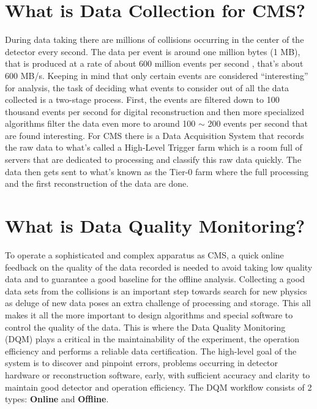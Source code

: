 \section{What is Data Collection for CMS?}

During data taking there are millions of collisions occurring in the center of the detector every second. The data per event is around one million bytes (1 MB), that is produced at a rate of about 
600 million events per second \cite{datataking}, that’s about 600 MB/s. Keeping in mind that only certain events are considered “interesting” for analysis, the task of deciding what events to consider out of all the data collected is a two-stage process. 
First, the events are filtered down to 100 thousand events per second for digital reconstruction and then more specialized algorithms filter the data even more to around 100 $\sim$ 200 events per second that are found interesting.
For CMS there is a Data Acquisition System that records the raw data to what’s called a High-Level Trigger farm which is a room full of servers that are dedicated to processing and classify this raw data quickly. 
The data then gets sent to what’s known as the Tier-0 farm where the full processing and the first reconstruction of the data are done. \cite{cmscomputing} 


\section{What is Data Quality Monitoring?}
To operate a sophisticated and complex apparatus as CMS, a quick online feedback on the quality of the data recorded is needed to avoid taking low quality data and to guarantee a good baseline for the offline analysis. Collecting a good data sets from the collisions is an important step towards search for new physics as deluge of new data poses an extra challenge of processing and storage. This all makes it all the more important to design algorithms and special software to control the quality of the data. This is where the Data Quality Monitoring (DQM)\cite{1742-6596-219-7-072020} plays a critical in the maintainability of the experiment, the operation efficiency and performs a reliable data certification.  The high-level goal of the system is to discover and pinpoint errors, problems occurring in detector hardware or reconstruction software, early, with sufficient accuracy and clarity to maintain good detector and operation efficiency. The DQM workflow consists of 2 types: \textbf{Online}  and \textbf{Offline}.

